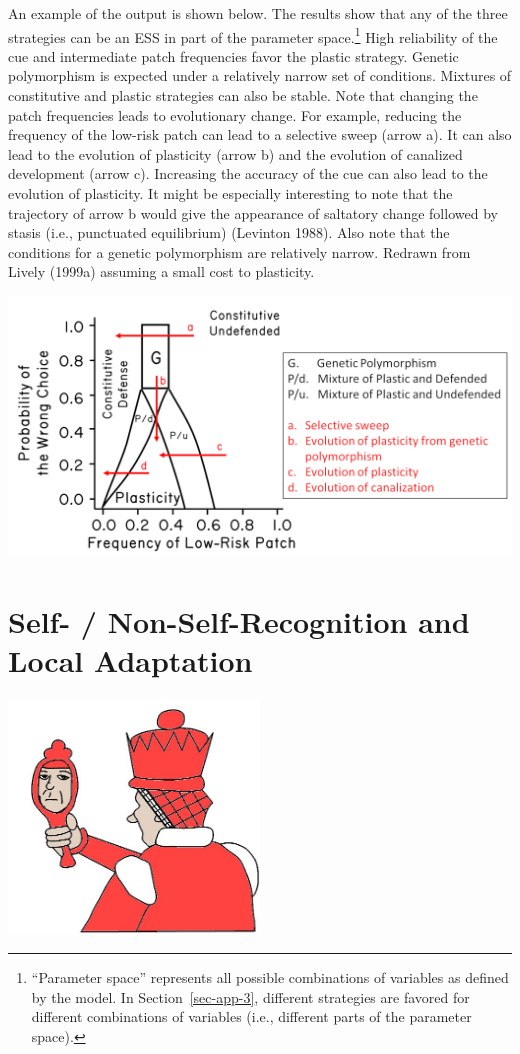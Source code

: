 \documentclass[
  letterpaper,
]{book}
\begin{document}
An example of the output is shown below. The results show that any of
the three strategies can be an ESS in part of the parameter
space.\footnote{``Parameter space'' represents all possible combinations
  of variables as defined by the model. In Section~\ref{sec-app-3},
  different strategies are favored for different combinations of
  variables (i.e., different parts of the parameter space).} High
reliability of the cue and intermediate patch frequencies favor the
plastic strategy. Genetic polymorphism is expected under a relatively
narrow set of conditions. Mixtures of constitutive and plastic
strategies can also be stable. Note that changing the patch frequencies
leads to evolutionary change. For example, reducing the frequency of the
low-risk patch can lead to a selective sweep (arrow a). It can also lead
to the evolution of plasticity (arrow b) and the evolution of canalized
development (arrow c). Increasing the accuracy of the cue can also lead
to the evolution of plasticity. It might be especially interesting to
note that the trajectory of arrow b would give the appearance of
saltatory change followed by stasis (i.e., punctuated equilibrium)
(Levinton 1988). Also note that the conditions for a genetic
polymorphism are relatively narrow. Redrawn from Lively (1999a) assuming
a small cost to plasticity.

\includegraphics{images/fig3-7_hr.png}


\chapter{Self- / Non-Self-Recognition and Local
Adaptation}\label{self--non-self-recognition-and-local-adaptation}

\begin{center}
\includegraphics[width=0.5\textwidth,height=\textheight]{images/fig4-1.jpeg}
\end{center}
\end{document}
